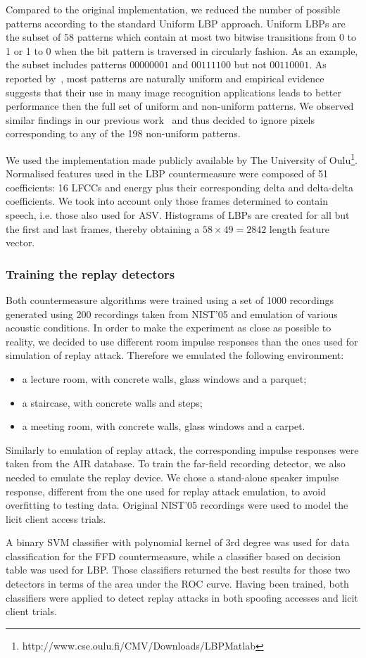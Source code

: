Compared to the original implementation, we reduced the number of possible patterns according to the standard Uniform LBP approach. Uniform LBPs are the subset of $58$ patterns which contain at most two bitwise transitions from 0 to 1 or 1 to 0 when the bit pattern is traversed in circularly fashion.  As an example, the subset includes patterns $00000001$ and $00111100$ but not $00110001$.  As reported by~\cite{Ojala2002}, most patterns are naturally uniform and empirical evidence suggests that their use in many image recognition applications leads to better performance then the full set of uniform and non-uniform patterns.  We observed similar findings in our previous work~\cite{Alegre2013a} and thus decided to ignore pixels corresponding to any of the 198 non-uniform patterns.

We used the implementation made publicly available by The University of Oulu\footnote{http://www.cse.oulu.fi/CMV/Downloads/LBPMatlab}. Normalised features used in the LBP countermeasure were composed of 51 coefficients: 16 LFCCs and energy plus their corresponding delta and delta-delta coefficients. We took into account only those frames determined to contain speech, i.e. those also used for ASV. Histograms of LBPs are created for all but the first and last frames, thereby obtaining a $58 \times 49 = 2842$ length feature vector.

\subsubsection{Training the replay detectors} Both countermeasure algorithms were trained using a set of 1000 recordings generated using 200 recordings taken from NIST'05 and emulation of various acoustic conditions. In order to make the experiment as close as possible to reality, we decided to use different room impulse responses than the ones used for simulation of replay attack. Therefore we emulated the following environment:
\begin{itemize}
\item a lecture room, with concrete walls, glass windows and a parquet;
\item a staircase, with concrete walls and steps;
\item a meeting room, with concrete walls, glass windows and a carpet.
\end{itemize}

Similarly to emulation of replay attack, the corresponding impulse responses were taken from the AIR database. To train the far-field recording detector, we also needed to emulate the replay device. We chose a stand-alone speaker impulse response, different from the one used for replay attack emulation, to avoid overfitting to testing data. Original NIST'05 recordings were used to model the licit client access trials.

A binary SVM classifier with polynomial kernel of 3rd degree was used for data classification for the FFD countermeasure, while a classifier based on decision table was used for LBP. Those classifiers returned the best results for those two detectors in terms of the area under the ROC curve. Having been trained, both classifiers were applied to detect replay attacks in both spoofing accesses and licit client trials.
